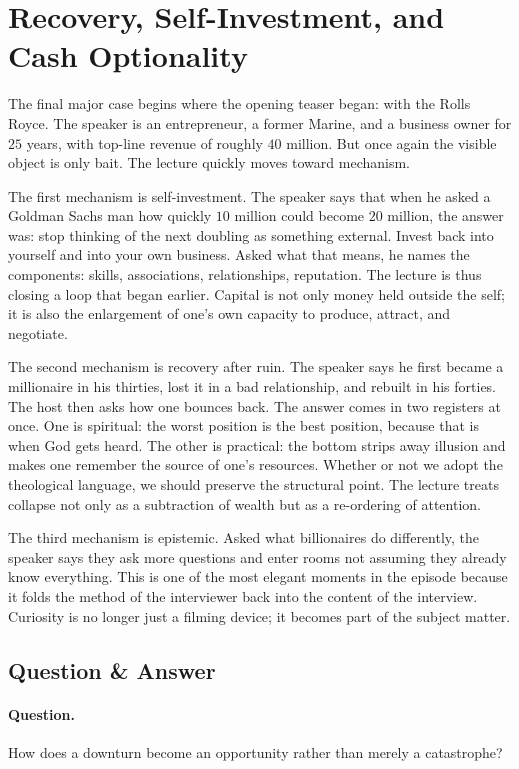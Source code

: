 \section{Recovery, Self-Investment, and Cash Optionality}

The final major case begins where the opening teaser began: with the Rolls Royce. The speaker is an entrepreneur, a former Marine, and a business owner for \(25\) years, with top-line revenue of roughly \(40\) million. But once again the visible object is only bait. The lecture quickly moves toward mechanism.

The first mechanism is self-investment. The speaker says that when he asked a Goldman Sachs man how quickly \(10\) million could become \(20\) million, the answer was: stop thinking of the next doubling as something external. Invest back into yourself and into your own business. Asked what that means, he names the components: skills, associations, relationships, reputation. The lecture is thus closing a loop that began earlier. Capital is not only money held outside the self; it is also the enlargement of one's own capacity to produce, attract, and negotiate.

The second mechanism is recovery after ruin. The speaker says he first became a millionaire in his thirties, lost it in a bad relationship, and rebuilt in his forties. The host then asks how one bounces back. The answer comes in two registers at once. One is spiritual: the worst position is the best position, because that is when God gets heard. The other is practical: the bottom strips away illusion and makes one remember the source of one's resources. Whether or not we adopt the theological language, we should preserve the structural point. The lecture treats collapse not only as a subtraction of wealth but as a re-ordering of attention.

The third mechanism is epistemic. Asked what billionaires do differently, the speaker says they ask more questions and enter rooms not assuming they already know everything. This is one of the most elegant moments in the episode because it folds the method of the interviewer back into the content of the interview. Curiosity is no longer just a filming device; it becomes part of the subject matter.

\subsection{Question \& Answer}

\paragraph{Question.} How does a downturn become an opportunity rather than merely a catastrophe?

